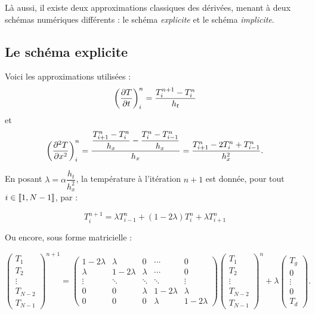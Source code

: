 Là aussi, il existe deux approximations classiques des dérivées, menant à deux schémas numériques différents : le 
schéma \emph{explicite} et le schéma \emph{implicite}.


\subsection{Le schéma explicite}

Voici les approximations utilisées :
$$\left( \dfrac{\partial T}{\partial t}\right)_i^n=\dfrac{T_i^{n+1}-T_i^n}{h_t}$$
et
$$\left( \dfrac{\partial^2T}{\partial x^2}\right)_i^n=\dfrac{\dfrac{T_{i+1}^n-T_i^n}{h_x}-\dfrac{T_i^n-T_{i-1}^n}{h_x}}{h_x}=
\dfrac{T_{i+1}^n-2T_i^n+T_{i-1}^n}{h_x^2}.$$


En posant $\lambda = \alpha\dfrac{h_t}{h_x^2}$, la température à l'itération $n+1$ est donnée, pour tout 
$i\in\llbracket1,N-1\rrbracket$, par :

$$ T_i^{n+1} = \lambda T_{i-1}^n+(1-2\lambda)T_i^n+ \lambda T_{i+1}^n$$


Ou encore, sous forme matricielle :

$$\begin{pmatrix} T_1\\T_2\\ \vdots \\T_{N-2}\\ T_{N-1} \end{pmatrix} ^{n+1} = 
\begin{pmatrix}1-2\lambda & \lambda 	& 0 		& \cdots 	& 0 \\
\lambda 	& 1-2\lambda 	& \lambda 	& \cdots 	& 0\\
\vdots		& \ddots 	& \ddots 	& \ddots 	& \vdots \\
0		& 0		& \lambda 	& 1-2\lambda 	& \lambda \\
0		& 0		& 0		& \lambda 	& 1-2\lambda \end{pmatrix}
\begin{pmatrix} T_1\\T_2\\ \vdots \\T_{N-2}\\ T_{N-1} \end{pmatrix} ^{n} + \lambda \begin{pmatrix} T_g\\ 0\\ \vdots \\ 
0\\ T_d \end{pmatrix}.$$

